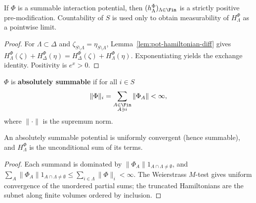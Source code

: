 \begin{proposition}
    \label{prop:pot-premodification}
    \leanok{}

    If $\Phi$ is a summable interaction potential, then $(h_\Lambda^\Phi)_{\Lambda\in\Fin}$ is a
    strictly positive pre-modification. Countability of $S$ is used only to obtain
    measurability of $H_\Lambda^\Phi$ as a pointwise limit.
\end{proposition}
\begin{proof}
    \leanok{}

    For $\Lambda\subset\Delta$ and $\zeta_{S\setminus\Lambda}=\eta_{S\setminus\Lambda}$,
    Lemma~\ref{lem:pot-hamiltonian-diff} gives
    $H_\Lambda^\Phi(\zeta)+H_\Delta^\Phi(\eta)=H_\Delta^\Phi(\zeta)+H_\Lambda^\Phi(\eta)$.
    Exponentiating yields the exchange identity. Positivity is $e^x>0$.
\end{proof}

\begin{definition}
    \label{def:pot-abs-summable}
    \leanok{}

    $\Phi$ is \textbf{absolutely summable} if for all $i\in S$
    \[
      \|\Phi\|_i=\sum_{\substack{A\in\Fin\\ A\ni i}}\|\Phi_A\|<\infty,
    \]
    where $\|\cdot\|$ is the supremum norm.
\end{definition}

\begin{lemma}
    \label{lem:pot-abs-summable-summable}
    \leanok{}

    An absolutely summable potential is uniformly convergent (hence summable), and
    $H_\Lambda^\Phi$ is the unconditional sum of its terms.
\end{lemma}
\begin{proof}
    \leanok{}

    Each summand is dominated by $\|\Phi_A\|1_{A\cap\Lambda\neq\emptyset}$, and
    $\sum_A\|\Phi_A\|1_{A\cap\Lambda\neq\emptyset}\le\sum_{i\in\Lambda}\|\Phi\|_i<\infty$.
    The Weierstrass $M$-test gives uniform convergence of the unordered partial sums; the
    truncated Hamiltonians are the subnet along finite volumes ordered by inclusion.
\end{proof}

